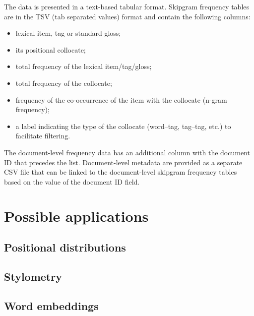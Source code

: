 \documentclass[12pt]{article}
\begin{document}
The data is presented in a text-based tabular format. Skipgram
frequency tables are in the TSV (tab separated values) format and
contain the following columns:
\begin{itemize}
\item lexical item, tag or standard gloss;
\item its positional collocate;
\item total frequency of the lexical item/tag/gloss;
\item total frequency of the collocate;
\item frequency of the co-occurrence of the item with the collocate
  (n-gram frequency);
\item a label indicating the type of the collocate (word--tag,
  tag--tag, etc.) to facilitate filtering.
\end{itemize}
The document-level frequency data has an additional column with the
document ID that precedes the list.  Document-level metadata are provided
as a separate CSV file that can be linked to the document-level
skipgram frequency tables based on the value of the document ID
field. 



\section{Possible applications}
\label{sec:applications}


\subsection{Positional distributions}


\subsection{Stylometry}





\subsection{Word embeddings}
\end{document}
